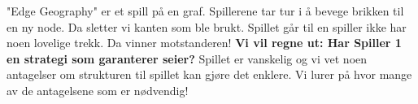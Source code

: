 "Edge Geography" er et spill på en graf.
Spillerene tar tur i å bevege brikken til en 
ny node. Da 
sletter vi kanten som ble brukt. 
Spillet går til en spiller ikke har noen lovelige 
trekk. Da vinner motstanderen!
\PosterPara
\textbf{Vi vil regne ut: Har Spiller 1 en 
strategi som garanterer seier?}
\PosterPara
Spillet er vanskelig og vi vet 
noen antagelser om strukturen til spillet 
kan gjøre det enklere. Vi lurer på hvor mange av 
de antagelsene som er nødvendig! 